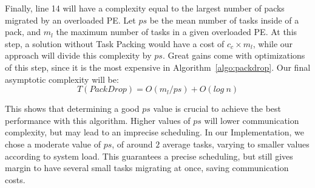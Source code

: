 Finally, line 14 will have a complexity equal to the largest number of packs migrated by an overloaded PE.
Let $ps$ be the mean number of tasks inside of a pack, and $m_l$ the maximum number of tasks in a given overloaded PE.
At this step, a solution without Task Packing would have a cost of $c_c\times m_l$, while our approach will divide this complexity by $ps$. 
Great gains come with optimizations of this step, since it is the most expensive in Algorithm~\ref{algo:packdrop}. 
Our final asymptotic complexity will be:
\begin{equation}
 T(PackDrop) = O(m_l/ps) + O(log\ n)
 \label{eq:worstcase}
\end{equation}

This shows that determining a good $ps$ value is crucial to achieve the best performance with this algorithm.
Higher values of $ps$ will lower communication complexity, but may lead to an imprecise scheduling.
In our Implementation, we chose a moderate value of $ps$, of around $2$ average tasks, varying to smaller values according to system load.
This guarantees a precise scheduling, but still gives margin to have several small tasks migrating at once, saving communication costs.

